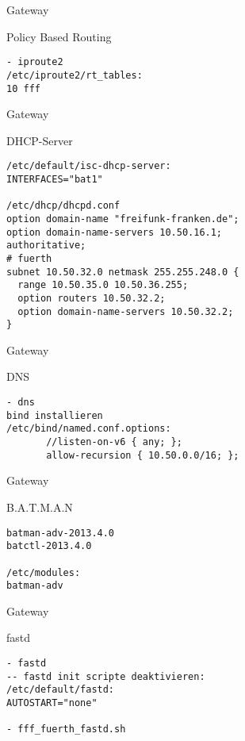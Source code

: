 \begin{frame}[fragile]{Gateway}
    \begin{block}{Policy Based Routing}
        \begin{lstlisting}
- iproute2
/etc/iproute2/rt_tables:
10 fff
        \end{lstlisting}
    \end{block}
\end{frame}

\begin{frame}[fragile]{Gateway}
    \begin{block}{DHCP-Server}
        \begin{lstlisting}
/etc/default/isc-dhcp-server:
INTERFACES="bat1"

/etc/dhcp/dhcpd.conf
option domain-name "freifunk-franken.de";
option domain-name-servers 10.50.16.1;
authoritative;
# fuerth
subnet 10.50.32.0 netmask 255.255.248.0 {
  range 10.50.35.0 10.50.36.255;
  option routers 10.50.32.2;
  option domain-name-servers 10.50.32.2;
}
        \end{lstlisting}
    \end{block}
\end{frame}

\begin{frame}[fragile]{Gateway}
    \begin{block}{DNS}
        \begin{lstlisting}
- dns
bind installieren
/etc/bind/named.conf.options:
       //listen-on-v6 { any; };
       allow-recursion { 10.50.0.0/16; };
        \end{lstlisting}
    \end{block}
\end{frame}


\begin{frame}[fragile]{Gateway}
    \begin{block}{B.A.T.M.A.N}
        \begin{lstlisting}
batman-adv-2013.4.0
batctl-2013.4.0

/etc/modules:
batman-adv
        \end{lstlisting}
    \end{block}
\end{frame}

\begin{frame}[fragile]{Gateway}
    \begin{block}{fastd}
        \begin{lstlisting}
- fastd
-- fastd init scripte deaktivieren:
/etc/default/fastd:
AUTOSTART="none"

- fff_fuerth_fastd.sh
        \end{lstlisting}
    \end{block}
\end{frame}

